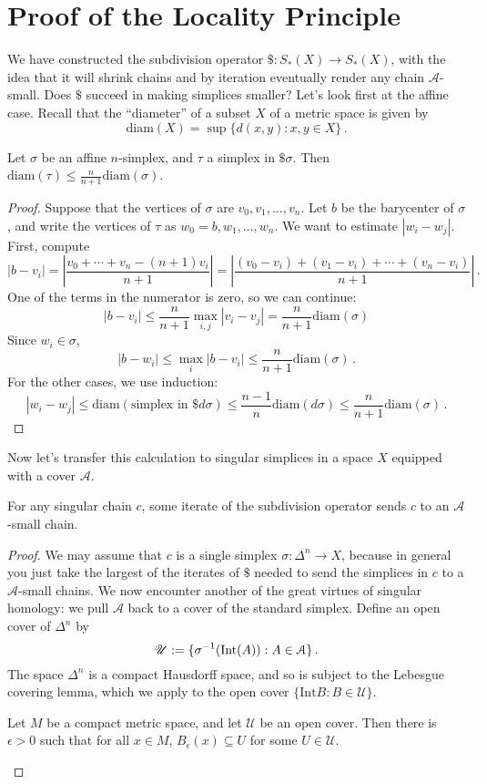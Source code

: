 \section{Proof of the Locality Principle}

We have constructed the subdivision operator $\$:S_*(X)\to S_*(X)$, with the
idea that it will shrink chains and by iteration eventually render any chain 
$\mathscr{A}$-small. Does $\$$ succeed in making simplices smaller? Let's 
look first at the affine case. Recall that the ``diameter'' of a subset $X$ of 
a metric space is given by
\[
\mathrm{diam}(X)=\sup\{d(x,y):x,y\in X\}\,.
\]

\begin{lemma}
Let $\sigma$ be an affine $n$-simplex, and $\tau$ a simplex in $\$\sigma$.
Then $\mathrm{diam}(\tau)\leq \frac{n}{n+1}\mathrm{diam}(\sigma)$.
\end{lemma}
\begin{proof}
Suppose that the vertices of $\sigma$ are $v_0,v_1,\ldots,v_n$. Let $b$ be the 
barycenter of $\sigma$, and write the vertices of $\tau$ as $w_0=b,w_1,\ldots,w_n$. We want to estimate $|w_i-w_j|$. First, compute
\[
|b-v_i|  =\left|\frac{v_0+\cdots+v_n-(n+1)v_i}{n+1}\right|
=\left|\frac{(v_0-v_i)+(v_1-v_i)+\cdots+(v_n-v_i)}{n+1}\right|\,.
\]
One of the terms in the numerator is zero, so we can continue: 
\[
|b-v_i| \leq \frac{n}{n+1}\max_{i,j}|v_i-v_j| 
= \frac{n}{n+1}\mathrm{diam}(\sigma)
\]
Since $w_i\in\sigma$, 
\[
|b-w_i| \leq\max_i|b-v_i| \leq \frac{n}{n+1}\mathrm{diam}(\sigma)\,.
\]
For the other cases, we use induction:
\[
|w_i-w_j| \leq \mathrm{diam}(\text{simplex in }\$d\sigma)
\leq \frac{n-1}{n}\mathrm{diam}(d\sigma)
\leq \frac{n}{n+1}\mathrm{diam}(\sigma)\,.
\]
\end{proof}

Now let's transfer this calculation to singular simplices in a space $X$ 
equipped with a cover $\mathscr{A}$. 
\begin{lemma}
For any singular chain $c$, some iterate of the subdivision operator sends $c$ to an $\mathscr{A}$-small chain.
\end{lemma}
\begin{proof} We may assume that $c$ is a single simplex $\sigma:\Delta^n\to X$, because in general you just take the largest of the iterates of $\$$ needed to send the simplices in $c$ to a $\mathscr{A}$-small chains.
We now encounter another of the great virtues of singular homology:
we pull $\mathscr{A}$ back to a cover of the standard simplex. 
Define an open cover of $\Delta^n$ by 
\[
\mathscr{U}:=\{\sigma^{-1}(\mathrm{Int}(A)):A\in\mathcal{A}\}\,.
\]
The space $\Delta^n$ is a compact Hausdorff space, and so is subject to the
Lebesgue covering lemma, which we apply to the open cover 
$\{\mathrm{Int}B:B\in\mathscr{U}\}$. 
\begin{lemma}
Let $M$ be a compact metric space, and let $\mathscr{U}$ be an open cover. Then there is $\epsilon> 0$ such that for all $x\in M$, 
$B_\epsilon(x)\subseteq U$ for some $U\in \mathscr{U}$.
\end{lemma}
\end{proof}

